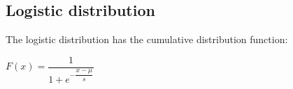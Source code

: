 
\subsection{Logistic distribution}

The logistic distribution has the cumulative distribution function:

\(F(x)=\dfrac{1}{1+e^{-\dfrac{x-\mu }{s}}} \)


